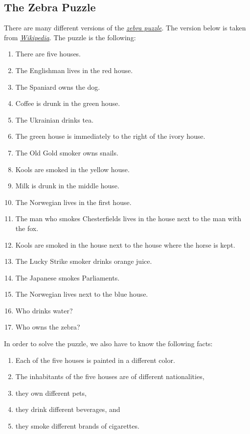 \subsection{The Zebra Puzzle}
There are many different versions of the
\href{https://en.wikipedia.org/wiki/Zebra_Puzzle}{\emph{zebra puzzle}}.  The version below is taken
from \href{https://en.wikipedia.org/wiki/Zebra_Puzzle}{\emph{Wikipedia}}.  The puzzle is the following:
\begin{enumerate}
\item There are five houses.
\item The Englishman lives in the red house.
\item The Spaniard owns the dog.
\item Coffee is drunk in the green house.
\item The Ukrainian drinks tea.
\item The green house is immediately to the right of the ivory house.
\item The Old Gold smoker owns snails.
\item Kools are smoked in the yellow house.
\item Milk is drunk in the middle house.
\item The Norwegian lives in the first house.
\item The man who smokes Chesterfields lives in the house next to the man with the fox.
\item Kools are smoked in the house next to the house where the horse is kept.
\item The Lucky Strike smoker drinks orange juice.
\item The Japanese smokes Parliaments.
\item The Norwegian lives next to the blue house.
\item Who drinks water? 
\item Who owns the zebra?
\end{enumerate}
In order to solve the puzzle, we also have to know the following facts:
\begin{enumerate}
\item Each of the five houses is painted in a different color.
\item The inhabitants of the five houses are of different nationalities,
\item they own different pets, 
\item they drink different beverages, and 
\item they smoke different brands of cigarettes. 
\end{enumerate}

